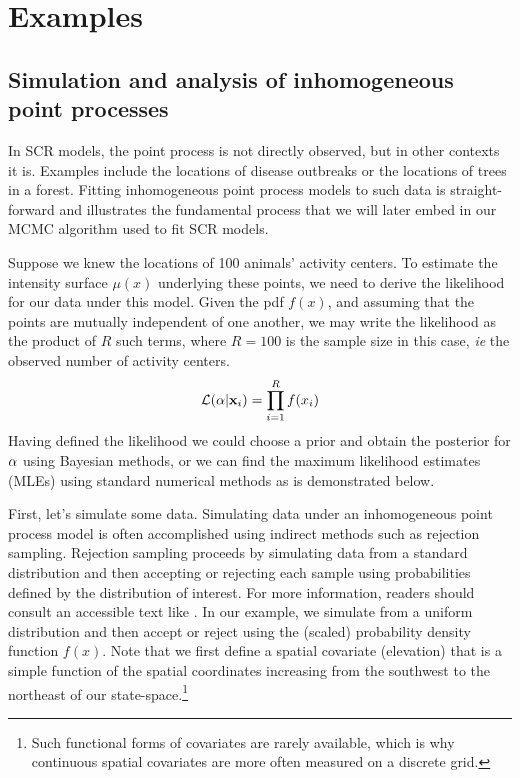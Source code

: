 \section{Examples}

\subsection{Simulation and analysis of inhomogeneous point processes}

In SCR models, the point process is not directly observed, but in
other contexts it is. %
Examples include the locations of disease
outbreaks or the locations of trees in a forest. Fitting inhomogeneous
point process models to such data is straight-forward and illustrates
the fundamental process that we will later embed in our MCMC algorithm
used to fit SCR models.

Suppose we knew the locations of 100 animals' activity
centers. To estimate the intensity surface $\mu(x)$ underlying these points, we
need to derive the likelihood for our data under this model. Given the
pdf $f(x)$, and assuming that the points are
mutually independent of one another, we may write
the likelihood as the product
of $R$ such terms, where $R=100$ is the sample size in this case,
\emph{ie} the observed number of activity centers.
\[
\mathcal{L}({\bf \alpha} | {\bf x}_i) = \prod_{i=1}^R f(x_i)
\]
Having defined the likelihood we could choose a prior and obtain the posterior for
$\bf \alpha$ using Bayesian methods, or we can find the maximum likelihood
estimates (MLEs) using standard numerical methods as is demonstrated
below.

First, let's simulate some data. Simulating data under an inhomogeneous point process model is often
accomplished using indirect methods such as rejection
sampling. Rejection sampling proceeds by
simulating data from a standard distribution and then accepting or
rejecting each sample using probabilities defined by the distribution
of interest. For more information, readers should consult an
accessible text like \citet{robert_casella:2004}. In our example, we
simulate from a uniform distribution and then accept or reject using
the (scaled) probability density function $f(x)$. Note that we first define a
spatial covariate (elevation) that is a simple function of the spatial
coordinates increasing from the southwest to the northeast of our
state-space.\footnote{Such functional forms of
covariates are rarely available, which is why continuous spatial
covariates are more often measured on a discrete grid.}

